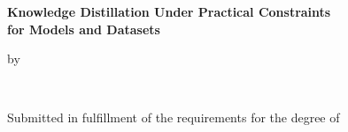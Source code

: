 \begin{titlepage}
  \centering
  \vspace*{\fill}
  {\LARGE {}\bfseries Knowledge Distillation Under Practical Constraints \\ for Models and Datasets \par}
  \vspace{2cm}
  {\large by \par}
  \vspace{1cm}
  {\Large \authorname \\ \authordegrees \par}
  \vspace{3cm}
  {\large Submitted in fulfillment of the requirements for the degree of \\ \degree \par}
  \vspace{2cm}
  {\Large \university \par}
  \vspace{0.5cm}
  {\large \submissiondate \par}
  \vspace{2.5cm}
  \vfill
\end{titlepage}
